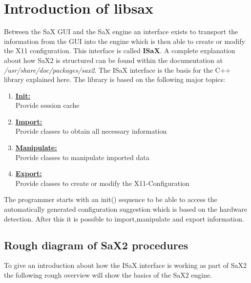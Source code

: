 \chapter{Introduction of libsax}
\minitoc

Between the SaX GUI and the SaX engine an interface exists to
transport the information from the GUI into the engine which
is then able to create or modify the X11 configuration. This
interface is called \textbf{ISaX}. A complete explanation about
how SaX2 is structured can be found within the documentation
at \textit{/usr/share/doc/packages/sax2}. 
The ISaX interface is the basis for the C++ library explained here.
The library is based on the following major topics:

\begin{enumerate}
\item \textbf{\underline{Init:}}\\
      Provide session cache
\item \textbf{\underline{Import:}}\\
      Provide classes to obtain all necessary information
\item \textbf{\underline{Manipulate:}}\\
      Provide classes to manipulate imported data
\item \textbf{\underline{Export:}}\\
      Provide classes to create or modify the X11-Configuration
\end{enumerate}

The programmer starts with an init() sequence to be able to
access the automatically generated configuration suggestion which is
based on the hardware detection. After this it is possible to
import,manipulate and export information.

\section{Rough diagram of SaX2 procedures}
To give an introduction about how the ISaX interface is working
as part of SaX2 the following rough overview will show the basics
of the SaX2 engine.

\newpage

